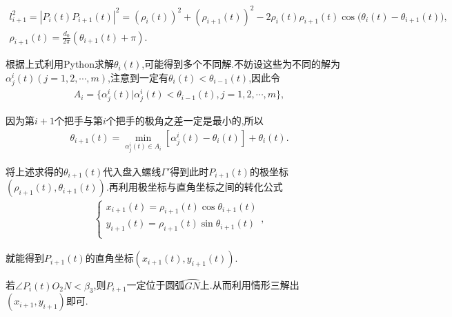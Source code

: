 \documentclass[../main.tex]{subfiles}
\begin{document}
\begin{gather}\label{1.........458}
l_{i+1}^{2}=|P_i(t)P_{i+1}(t)|^2=(\rho _i(t))^2+(\rho _{i+1}(t))^2-2\rho _i(t)\rho _{i+1}(t)\cos\mathrm{(}\theta _i(t)-\theta _{i+1}(t)),
\\
\rho _{i+1}(t)=\frac{d_0}{2\pi}\left( \theta _{i+1}(t)+\pi \right) .
\end{gather}
\par 根据上式利用Python求解\(\theta _{i}(t)\),可能得到多个不同解.不妨设这些为不同的解为\(\alpha _{j}^{i}(t) (j = 1,2,\cdots ,m)\),注意到一定有\(\theta _{i}(t)<\theta _{i-1}(t)\),因此令
\begin{align}\label{1.........459}
A_i = \{ \alpha _{j}^{i}(t) |\alpha _{j}^{i}(t) <\theta _{i-1}(t),j = 1,2,\cdots ,m \},
\end{align}
\par 因为第\(i + 1\)个把手与第$i$个把手的极角之差一定是最小的,所以
\begin{align}\label{1.........460}
\theta _{i+1}(t)=\underset{\alpha _{j}^{i}(t)\in A_i}{\min}\left[ \alpha _{j}^{i}\left( t \right) -\theta _i\left( t \right) \right] +\theta _i\left( t \right) .
\end{align}
\par 将上述求得的\(\theta _{i+1}(t)\)代入盘入螺线$\varGamma'$得到此时\(P_{i+1}(t)\)的极坐标\((\rho _{i+1}(t),\theta _{i+1}(t))\).再利用极坐标与直角坐标之间的转化公式
\begin{align}\label{1.........461}
\begin{cases}
x_{i+1}(t)=\rho _{i+1}(t)\cos \theta _{i+1}(t)\\
y_{i+1}(t)=\rho _{i+1}(t)\sin \theta _{i+1}(t)\\
\end{cases}, 
\end{align}
\par 就能得到\(P_{i+1}(t)\)的直角坐标\((x_{i+1}(t),y_{i+1}(t))\).

\par 若$\angle P_i(t)O_2N< \beta_3$,则$P_{i+1}$一定位于圆弧$\wideparen{GN}$上.从而利用情形三解出$(x_{i+1},y_{i+1})$即可.
\end{document}
